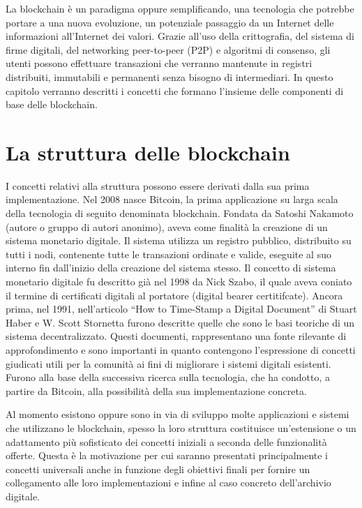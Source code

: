 La blockchain è un paradigma oppure semplificando, una tecnologia che potrebbe portare a una nuova evoluzione, un potenziale passaggio da un Internet delle informazioni all’Internet dei valori. Grazie all’uso della crittografia, del sistema di firme digitali, del networking peer-to-peer (P2P) e algoritmi di consenso, gli utenti possono effettuare transazioni che verranno mantenute in registri distribuiti, immutabili e permanenti senza bisogno di intermediari. In questo capitolo verranno descritti i concetti che formano l’insieme delle componenti di base delle blockchain.

\section{La struttura delle blockchain}

I concetti relativi alla struttura possono essere derivati dalla sua prima implementazione. Nel 2008 nasce Bitcoin, la prima applicazione su larga scala della tecnologia di seguito denominata blockchain. Fondata da Satoshi Nakamoto (autore o gruppo di autori anonimo), aveva come finalità la creazione di un sistema monetario digitale. Il sistema utilizza un registro pubblico, distribuito su tutti i nodi, contenente tutte le transazioni ordinate e valide, eseguite al suo interno fin dall’inizio della creazione del sistema stesso. Il concetto di sistema monetario digitale fu descritto già nel 1998 da Nick Szabo, il quale aveva coniato il termine di certificati digitali al portatore (digital bearer certitifcate). Ancora prima, nel 1991, nell’articolo “How to Time-Stamp a Digital Document” di Stuart Haber e W. Scott Stornetta furono descritte quelle che sono le basi teoriche di un sistema decentralizzato. Questi documenti, rappresentano una fonte rilevante di approfondimento e sono importanti in quanto contengono l’espressione di concetti giudicati utili per la comunità ai fini di migliorare i sistemi digitali esistenti. Furono alla base della successiva ricerca sulla tecnologia, che ha condotto, a partire da Bitcoin, alla possibilità della sua implementazione concreta.

Al momento esistono oppure sono in via di sviluppo molte applicazioni e sistemi che utilizzano le blockchain, spesso la loro struttura costituisce un’estensione o un adattamento più sofisticato dei concetti iniziali a seconda delle funzionalità offerte. Questa è la motivazione per cui saranno presentati principalmente i concetti universali anche in funzione degli obiettivi finali per fornire un collegamento alle loro implementazioni e infine al caso concreto dell’archivio digitale.

